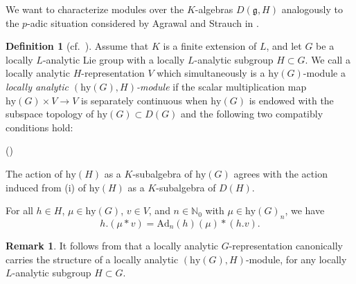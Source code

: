 \documentclass[a4paper, reqno, 10pt]{amsart}
\theoremstyle{definition}
\newtheorem{definition}[theorem]{Definition}
\newtheorem{remark}[theorem]{Remark}
\newenvironment{altenumeratelevel2}
{\begin{list}
		{\textup{(\theenumi)} }
		{\usecounter{enumii}
			\setlength{\labelwidth}{2em}
			\setlength{\labelsep}{0pt}
			\setlength{\leftmargin}{2em}
			\setlength{\itemsep}{2pt}
			\setlength{\topsep}{2pt}
			\setlength{\itemindent}{0pt}
			\renewcommand{\theenumi}{\arabic{enumii}}
	}}
	{\end{list}}
\numberwithin{equation}{section}
\newcommand{\Ad}{{\mathrm{Ad}}}
\newcommand{\hy}{{\mathrm{hy}}}
\newcommand{\ra}{\rightarrow}
\newcommand{\BN}{{\mathbb {N}}}
\newcommand{\Fg}{{\mathfrak {g}}}
\begin{document}
We want to characterize modules over the $K$-algebras $D(\Fg,H)$ analogously to the $p$-adic situation considered by Agrawal and Strauch in \cite{AgrawalStrauch22FromCatOLocAnRep}.



\begin{definition}[{cf.\ \cite[Def.\ 7.4.1]{AgrawalStrauch22FromCatOLocAnRep}}]\label{Def 1 - Compatible hyperalgebra modules}
	Assume that $K$ is a finite extension of $L$, and let $G$ be a locally $L$-analytic Lie group with a locally $L$-analytic subgroup $H\subset G$.
	We call a locally analytic $H$-representation $V$ which simultaneously is a $\hy(G)$-module a \textit{locally analytic $(\hy(G),H)$-module} if the scalar multiplication map $\hy(G) \times V \ra V$ is separately continuous when $\hy(G)$ is endowed with the subspace topology of $\hy(G) \subset D(G)$ and the following two compatibly conditions hold:
	\begin{altenumeratelevel2}
		\item
		The action of $\hy(H)$ as a $K$-subalgebra of $\hy(G)$ agrees with the action induced from  (i) of $\hy(H)$ as a $K$-subalgebra of $D(H)$.
		\item
		For all $h \in H$, $\mu\in \hy(G)$, $v \in V$, and $n\in \BN_0$ with $\mu \in \hy(G)_n$, we have 
		\begin{equation*}
			h. (\mu \ast v) = \Ad_n(h)(\mu) \ast (h.v) .
		\end{equation*}
	\end{altenumeratelevel2}
\end{definition}


\begin{remark}\label{Rmk 1 - Locally analytic representation induces compatible hyperalgebra module structure}
	It follows from  that a locally analytic $G$-representation canonically carries the structure of a locally analytic $(\hy(G),H)$-module, for any locally $L$-analytic subgroup $H\subset G$.
\end{remark}
\end{document}
